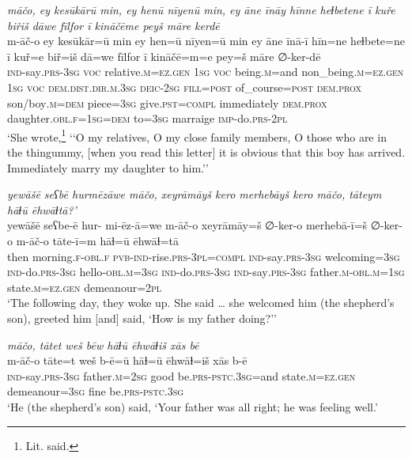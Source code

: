 \ea \label{KŠ.80}
\textit{māčo, ey kesūkārū min, ey henū nīyenū min, ey āne īnāy hīnne heɫbetene ī kuře biřiš dāwe fīlfor ī kināčēme peyš māre kerdē} \\ 
\gll m-āč-o ey kesūkār=ū min ey hen=ū nīyen=ū min ey āne īnā-ī hīn=ne heɫbete=ne ī kuř=e biř=iš dā=we fīlfor ī kināčē=m=e pey=š māre ∅-ker-dē \\ 
 \textsc{ind-}say\textsc{.prs}\textsc{-3sg} \textsc{voc} relative\textsc{.m}\textsc{\textsc{=ez.gen}} \textsc{1sg} \textsc{voc} being\textsc{.m}=and non\_being\textsc{.m}\textsc{\textsc{=ez.gen}} \textsc{1sg} \textsc{voc} \textsc{dem.dist}\textsc{.dir}\textsc{.m}\textsc{.3sg} \textsc{deic}-\textsc{2sg} \textsc{fill}\textsc{=\textsc{post}} of\_course\textsc{=\textsc{post}} \textsc{dem.prox} son/boy\textsc{.m}\textsc{=dem} piece\textsc{=3sg} give\textsc{.pst}\textsc{=compl} immediately \textsc{dem.prox} daughter\textsc{.obl}\textsc{.f}\textsc{=\textsc{1sg}}\textsc{=dem} to\textsc{=3sg} marraige \textsc{imp-}do\textsc{.prs}-\textsc{2pl} \\ 
\glt `She wrote,\footnote{Lit. said.} ‘‘O my relatives, O my close family members, O those who are in the thingummy, [when you read this letter] it is obvious that this boy has arrived. Immediately marry my daughter to him.’'
\z 
 
\ea \label{KŠ.81}
\textit{yewāšē seʕbē hurmēzāwe māčo, xeyrāmāyš kero merhebāyš kero māčo, tāteym hāɫū ēhwāɫtā?’} \\ 
\gll yewāšē seʕbe-ē hur- mi-ēz-ā=we m-āč-o xeyrāmāy=š ∅-ker-o merhebā-ī=š ∅-ker-o m-āč-o tāte-ī=m hāɫ=ū ēhwāɫ=tā \\ 
 then morning\textsc{.f}\textsc{-obl}\textsc{.f} \textsc{pvb-}\textsc{ind-}rise\textsc{.prs}\textsc{-3pl}\textsc{=compl} \textsc{ind-}say\textsc{.prs}\textsc{-3sg} welcoming\textsc{=3sg} \textsc{ind-}do\textsc{.prs}\textsc{-3sg} hello\textsc{-obl}\textsc{.m}\textsc{=3sg} \textsc{ind-}do\textsc{.prs}\textsc{-3sg} \textsc{ind-}say\textsc{.prs}\textsc{-3sg} father\textsc{.m}\textsc{-obl}\textsc{.m}\textsc{=\textsc{1sg}} state\textsc{.m}\textsc{\textsc{=ez.gen}} demeanour=\textsc{2pl} \\ 
\glt `The following day, they woke up. She said … she welcomed him (the shepherd’s son), greeted him [and] said, ‘How is my father doing?’'
\z 
 
\ea \label{KŠ.82}
\textit{māčo, tātet weš bēw hāɫū ēhwāɫiš xās bē} \\ 
\gll m-āč-o tāte=t weš b-ē=ū hāɫ=ū ēhwāɫ=iš xās b-ē \\ 
 \textsc{ind-}say\textsc{.prs}\textsc{-3sg} father\textsc{.m}\textsc{=\textsc{2sg}} good be\textsc{.prs}\textsc{-pstc}\textsc{.3sg}=and state\textsc{.m}\textsc{\textsc{=ez.gen}} demeanour\textsc{=3sg} fine be\textsc{.prs}\textsc{-pstc}\textsc{.3sg} \\ 
\glt `He (the shepherd’s son) said, ‘Your father was all right; he was feeling well.'
\z 
 
